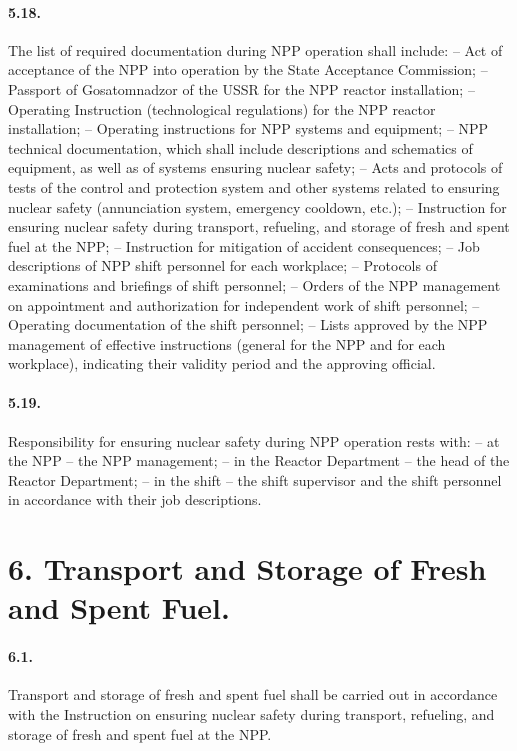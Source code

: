 \documentclass[openright]{bookest}
\begin{document}
\paragraph{5.18.} The list of required documentation during NPP operation shall include:
-- Act of acceptance of the NPP into operation by the State Acceptance Commission;
-- Passport of Gosatomnadzor of the USSR for the NPP reactor installation;
-- Operating Instruction (technological regulations) for the NPP reactor installation;
-- Operating instructions for NPP systems and equipment;
-- NPP technical documentation, which shall include descriptions and schematics of equipment, as well as of systems ensuring nuclear safety;
-- Acts and protocols of tests of the control and protection system and other systems related to ensuring nuclear safety (annunciation system, emergency cooldown, etc.);
-- Instruction for ensuring nuclear safety during transport, refueling, and storage of fresh and spent fuel at the NPP;
-- Instruction for mitigation of accident consequences;
-- Job descriptions of NPP shift personnel for each workplace;
-- Protocols of examinations and briefings of shift personnel;
-- Orders of the NPP management on appointment and authorization for independent work of shift personnel;
-- Operating documentation of the shift personnel;
-- Lists approved by the NPP management of effective instructions (general for the NPP and for each workplace), indicating their validity period and the approving official.

\paragraph{5.19.} Responsibility for ensuring nuclear safety during NPP operation rests with:
-- at the NPP -- the NPP management;
-- in the Reactor Department -- the head of the Reactor Department;
-- in the shift -- the shift supervisor and the shift personnel in accordance with their job descriptions.

\section*{6. Transport and Storage of Fresh and Spent Fuel.}

\paragraph{6.1.} Transport and storage of fresh and spent fuel shall be carried out in accordance with the Instruction on ensuring nuclear safety during transport, refueling, and storage of fresh and spent fuel at the NPP.
\end{document}
